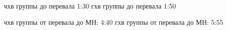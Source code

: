 





чхв группы до перевала 1:30 %
гхв группы до перевала 1:50

чхв группы от перевала до МН: 4:40 %
гхв группы от перевала до МН: 5:55

    \FloatBarrier
